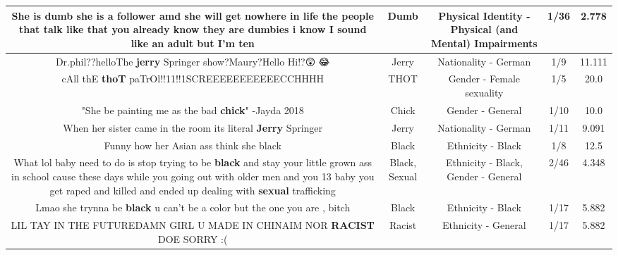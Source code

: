 \documentclass[11pt]{article}
\newlength\mylength
\begin{document}
\begin{center}
\begin{longtable}{|C{.65\mylength}|C{.30\mylength}|C{.12\mylength}|C{.12\mylength}|C{.12\mylength}|}
  \small She is \textbf{dumb} she is a follower amd she will get nowhere in life the people that talk like that you already know they are dumbies i know I sound like an adult but I'm ten\normalsize   & Dumb & Physical Identity - Physical (and Mental) Impairments & 1/36 & 2.778 \\  \hline
  \small Dr.phil??helloThe \textbf{jerry} Springer show?Maury?Hello Hi!?😲🤔😂\normalsize   & Jerry & Nationality - German & 1/9 & 11.111 \\  \hline
  \small cAll thE \textbf{thoT} paTrOl!!11!!1SCREEEEEEEEEEECCHHHH\normalsize   & THOT & Gender - Female sexuality & 1/5 & 20.0 \\  \hline
  \small "She be painting me as the bad \textbf{chick}"       -Jayda 2018\normalsize   & Chick & Gender - General & 1/10 & 10.0 \\  \hline
  \small When her sister came in the room its literal \textbf{Jerry} Springer\normalsize   & Jerry & Nationality - German & 1/11 & 9.091 \\  \hline
  \small Funny how her Asian ass think she black\normalsize   & Black & Ethnicity - Black & 1/8 & 12.5 \\  \hline
  \small What lol baby need to do is stop trying to be \textbf{black} and stay your little grown ass in school cause these days while you going out with older men and you 13 baby you get raped and killed and ended up dealing with \textbf{sexual}  trafficking\normalsize   & Black, Sexual & Ethnicity - Black, Gender - General & 2/46 & 4.348 \\  \hline
  \small Lmao she trynna be \textbf{black} u can't be a color but the one you are , bitch\normalsize   & Black & Ethnicity - Black & 1/17 & 5.882 \\  \hline
  \small LIL TAY IN THE FUTUREDAMN GIRL U MADE IN CHINAIM NOR \textbf{RACIST} DOE SORRY :(\normalsize   & Racist & Ethnicity - General & 1/17 & 5.882 \\  \hline

\end{longtable}
\end{center}
\end{document}
